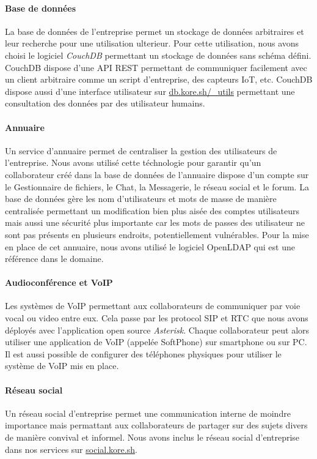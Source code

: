 \paragraph{Base de données} La base de données de l'entreprise permet un stockage de données arbitraires et leur recherche pour une utilisation ulterieur.
Pour cette utilisation, nous avons choisi le logiciel \emph{CouchDB} permettant un stockage de données sans schéma défini.
CouchDB dispose d'une API REST permettant de communiquer facilement avec un client arbitraire comme un script d'entreprise, des capteurs IoT, etc.
CouchDB dispose aussi d'une interface utilisateur sur \url{db.kore.sh/_utils} permettant une consultation des données par des utilisateur humains.

\paragraph{Annuaire} Un service d'annuaire permet de centraliser la gestion des utilisateurs de l'entreprise.
Nous avons utilisé cette téchnologie pour garantir qu'un collaborateur créé dans la base de données de l'annuaire dispose d'un compte sur le Gestionnaire de fichiers, le Chat, la Messagerie, le réseau social et le forum.
La base de données gère les nom d'utilisateurs et mots de masse de manière centralisée permettant un modification bien plus aisée des comptes utilisateurs mais aussi une sécurité plus importante car les mots de passes des utilisateur ne sont pas présents en plusieurs endroits, potentiellement vulnérables.
Pour la mise en place de cet annuaire, nous avons utilisé le logiciel OpenLDAP qui est une référence dans le domaine.

\paragraph{Audioconférence et VoIP} Les systèmes de VoIP permettant aux collaborateurs de communiquer par voie vocal ou video entre eux.
Cela passe par les protocol SIP et RTC que nous avons déployés avec l'application open source \emph{Asterisk}.
Chaque collaborateur peut alors utiliser une application de VoIP (appelée SoftPhone) sur smartphone ou sur PC.
Il est aussi possible de configurer des téléphones physiques pour utiliser le système de VoIP mis en place.

\paragraph{Réseau social} Un réseau social d'entreprise permet une communication interne de moindre importance mais permattant aux collaborateurs de partager sur des sujets divers de manière convival et informel.
Nous avons inclus le réseau social d'entreprise dans nos services sur \url{social.kore.sh}.


